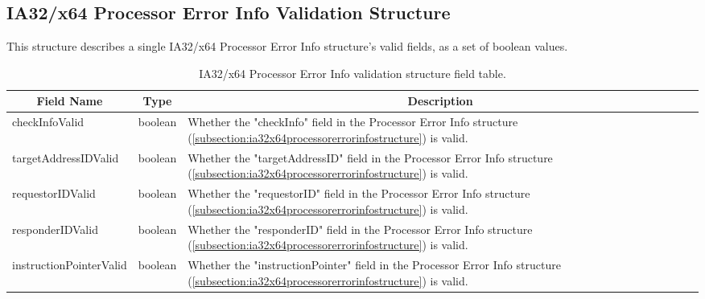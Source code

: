\documentclass{report}
\newcommand*{\thead}[1]{\multicolumn{1}{|c|}{\bfseries #1}}
\newcommand*{\jsontable}[1]{
    \begin{table}[!ht]
    \label{#1}
    \centering
    \begin{adjustbox}{center}
    \begin{tabular}{|l|c|p{8cm}|}
    \hline
    \thead{Field Name} & \thead{Type} & \thead{Description} \\
    \hline
}
\newcommand*{\jsontableend}[1]{
    \hline
    \end{tabular}
    \end{adjustbox}
    \caption{#1}
    \label{table:#1}
    \end{table}
    \FloatBarrier
}
\begin{document}
\subsection{IA32/x64 Processor Error Info Validation Structure}
\label{subsection:ia32x64processorerrorinfovalidationstructure}
This structure describes a single IA32/x64 Processor Error Info structure's valid fields, as a set of boolean values.
\jsontable{table:ia32x64processorerrorinfovalidationstructure}
checkInfoValid & boolean & Whether the "checkInfo" field in the Processor Error Info structure (\ref{subsection:ia32x64processorerrorinfostructure}) is valid.\\
\hline
targetAddressIDValid & boolean & Whether the "targetAddressID" field in the Processor Error Info structure (\ref{subsection:ia32x64processorerrorinfostructure}) is valid.\\
\hline
requestorIDValid & boolean & Whether the "requestorID" field in the Processor Error Info structure (\ref{subsection:ia32x64processorerrorinfostructure}) is valid.\\
\hline
responderIDValid & boolean & Whether the "responderID" field in the Processor Error Info structure (\ref{subsection:ia32x64processorerrorinfostructure}) is valid.\\
\hline
instructionPointerValid & boolean & Whether the "instructionPointer" field in the Processor Error Info structure (\ref{subsection:ia32x64processorerrorinfostructure}) is valid.\\
\hline
\jsontableend{IA32/x64 Processor Error Info validation structure field table.}

\end{document}
